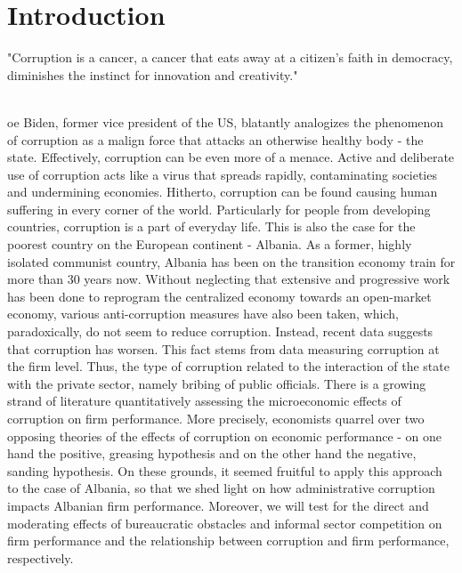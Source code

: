 %
%
\let\textcircled=\pgftextcircled
\chapter{Introduction}
\label{chap:intro}

\begin{center}
    "Corruption is a cancer, a cancer that eats away at a citizen's faith in democracy, diminishes the instinct for innovation and creativity." \citet{quote}
\end{center} \\

oe Biden, former vice president of the US, blatantly analogizes the phenomenon of corruption as a malign force that attacks an otherwise healthy body - the state. Effectively, corruption can be even more of a menace. Active and deliberate use of corruption acts like a virus that spreads rapidly, contaminating societies and undermining economies. Hitherto, corruption can be found causing human suffering in every corner of the world. Particularly for people from developing countries, corruption is a part of everyday life. This is also the case for the poorest country on the European continent - Albania. As a former, highly isolated communist country, Albania has been on the transition economy train for more than 30 years now. Without neglecting that extensive and progressive work has been done to reprogram the centralized economy towards an open-market economy, various anti-corruption measures have also been taken, which, paradoxically, do not seem to reduce corruption. Instead, recent data suggests that corruption has worsen. This fact stems from data measuring corruption at the firm level. Thus, the type of corruption related to the interaction of the state with the private sector, namely bribing of public officials. There is a growing strand of literature quantitatively assessing the microeconomic effects of corruption on firm performance. More precisely, economists quarrel over two opposing theories of the effects of corruption on economic performance - on one hand the positive, greasing hypothesis and on the other hand the negative, sanding hypothesis. On these grounds, it seemed fruitful to apply this approach to the case of Albania, so that we shed light on how administrative corruption impacts Albanian firm performance. Moreover, we will test for the direct and moderating effects of bureaucratic obstacles and informal sector competition on firm performance and the relationship between corruption and firm performance, respectively. 

